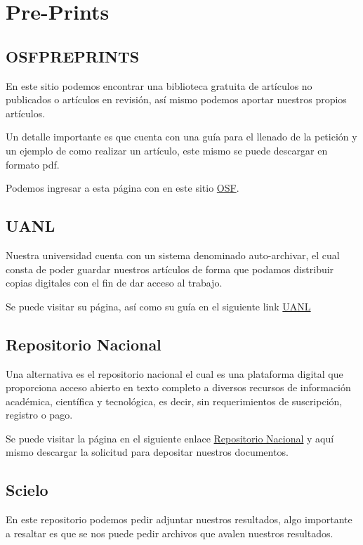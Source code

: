 \documentclass{report}
\begin{document}
\section*{Pre-Prints}

\subsection*{OSFPREPRINTS}
En este sitio podemos encontrar una biblioteca gratuita de artículos no publicados o artículos en revisión, así mismo podemos aportar nuestros propios artículos.

Un detalle importante es que cuenta con una guía para el llenado de la petición y un ejemplo de como realizar un artículo, este mismo se puede descargar en formato pdf.

Podemos ingresar a esta página con en este sitio \href{https://osf.io/preprints/}{OSF}.

\subsection*{UANL}

Nuestra universidad cuenta con un sistema denominado auto-archivar, el cual consta de poder guardar nuestros artículos de forma que podamos distribuir copias digitales con el fin de dar acceso al trabajo.

Se puede visitar su página, así como su guía en el siguiente link \href{http://eprints.uanl.mx}{UANL}

\subsection*{Repositorio Nacional}

Una alternativa es el repositorio nacional el cual es una plataforma digital que proporciona acceso abierto en texto completo a diversos recursos de información académica, científica y tecnológica, es decir, sin requerimientos de suscripción, registro o pago.

Se puede visitar la página en el siguiente enlace \href{https://www.repositorionacionalcti.mx}{Repositorio Nacional} y aquí mismo descargar la solicitud para depositar nuestros documentos.

\subsection*{Scielo}
En este repositorio podemos pedir adjuntar nuestros resultados, algo importante a resaltar es que se nos puede pedir archivos que avalen nuestros resultados.
\end{document}
